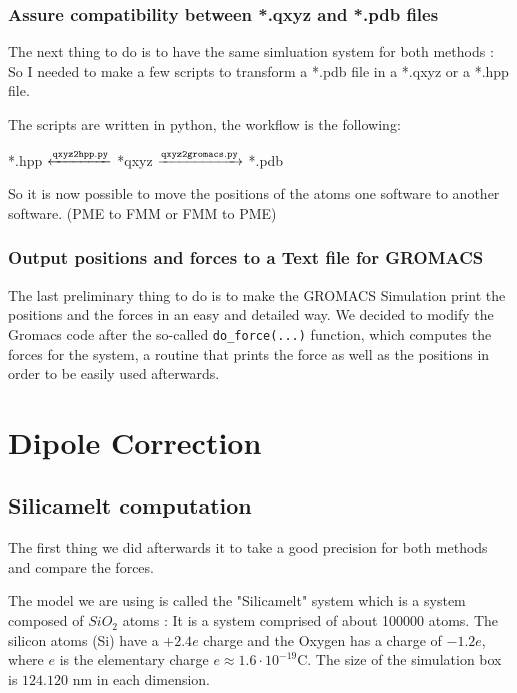 \documentclass[10pt,twoside,a4paper]{report}
\begin{document}
\subsubsection{Assure compatibility between *.qxyz and *.pdb files}

The next thing to do is to have the same simluation system for both methods : So I needed to make a few scripts to transform a *.pdb file in a *.qxyz or a *.hpp file.

The scripts are written in python, the workflow is the following:

{
	\centering 
	{
	
	  *.hpp $\xleftarrow{\tt{qxyz2hpp.py}}$  *qxyz $\xrightarrow{\tt{qxyz2gromacs.py}}$ *.pdb	
	}
}

So it is now possible to move the positions of the atoms one software to another software. (PME to FMM or FMM to PME)

\subsubsection{Output positions and forces to a Text file for GROMACS}

The last preliminary thing to do is to make the GROMACS Simulation print the positions and the forces in an easy and detailed way. We decided to modify the Gromacs code after the so-called {\tt{do\_force(...)}} function, which computes the forces for the system, a routine that prints the force as well as the positions in order to be
 easily used afterwards. 

\section{Dipole Correction}

\subsection{Silicamelt computation}

The first thing we did afterwards it to take a good precision for both methods and compare the forces.


The model we are using is called the "Silicamelt" system which is a system composed of $SiO_2$ atoms : It is a system comprised of about 100000 atoms. The silicon atoms (Si) have a $+2.4e$ charge and the Oxygen has a charge of $-1.2e$, where $e$ is the elementary charge $e \approx 1.6\cdot10^{-19} \text{C}$.
The size of the simulation box is $124.120$ nm in each dimension.
\end{document}

